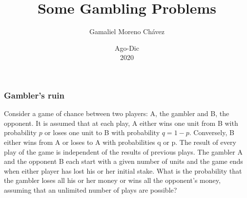 \documentclass[spanish]{beamer}
\begin{document}
\title{Some Gambling Problems}
\author{Gamaliel Moreno Chávez}
\date{Ago-Dic\\ 2020}%

\frame{\titlepage}

\begin{frame}
\frametitle{Gambler’s ruin}
Consider a game of chance between two players: A, the gambler and B, the opponent. It is assumed that at each play, A either wins one unit from B with probability
$p$ or loses one unit to B with probability $q = 1 - p$. Conversely, B either wins from A or loses to A with probabilities q or p. The result of every play of the game is independent of the results of previous plays. The gambler A and the opponent B
each start with a given number of units and the game ends when either player has
lost his or her initial stake. What is the probability that the gambler loses all his or her money or wins all the opponent’s money, assuming that an unlimited number of
plays are possible?
\end{frame}
\end{document}
